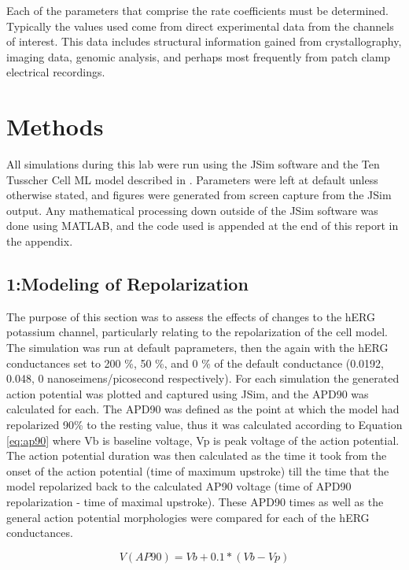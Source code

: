 \documentclass[11pt]{article}
\begin{document}
\par{}
Each of the parameters that comprise the rate coefficients must be determined. Typically the values used come from direct experimental data from the channels of interest. This data includes structural information gained from crystallography, imaging data, genomic analysis, and perhaps most frequently from patch clamp electrical recordings. 

\section{Methods}
\par{}
All simulations during this lab were run using the JSim software and the Ten Tusscher Cell ML model described in \cite{TenTusscher2003}. Parameters were left at default unless otherwise stated, and figures were generated from screen capture from the JSim output. Any mathematical processing down outside of the JSim software was done using MATLAB, and the code used is appended at the end of this report in the appendix.

\subsection{1:Modeling of Repolarization}
The purpose of this section was to assess the effects of changes to the hERG potassium channel, particularly relating to the repolarization of the cell model. The simulation was run at default paprameters, then the again with the hERG conductances set to 200 \%, 50 \%, and 0 \% of the default conductance (0.0192, 0.048, 0 nanoseimens/picosecond
respectively). For each simulation the generated action potential was plotted  and captured using JSim, and the APD90 was calculated for each. The APD90 was defined as the point at which the model had repolarized 90\% to the resting value, thus it was calculated according to Equation \ref{eq:ap90} where Vb is baseline voltage, Vp is peak voltage of the action potential. The action potential duration was then calculated as the time it took from the onset of the action potential (time of maximum upstroke) till the time that the model repolarized back to the calculated AP90 voltage (time of APD90 repolarization - time of maximal upstroke). These APD90 times as well as the general action potential morphologies were compared for each of the hERG conductances.

\begin{equation} 
V(AP90) = Vb + 0.1*(Vb-Vp)
\label{eq:ap90}
\end{equation}
\end{document}
